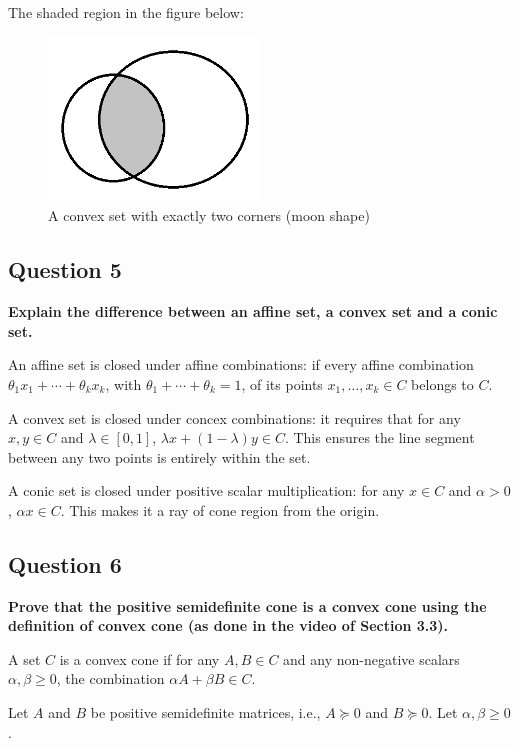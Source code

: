 The shaded region in the figure below: 

\begin{figure}[h]
\centering
\includegraphics[width=0.5\textwidth]{iRAT/Images/image_2_1.png}
\caption{A convex set with exactly two corners (moon shape)}
\end{figure}

\subsection*{Question 5}
\textbf{Explain the diﬀerence between an affine set, a convex set and a conic set.}

An affine set is closed under affine combinations: if every affine combination $\theta_1 x_1 + \cdots+ \theta_k x_k$, with $\theta_1 + \cdots+\theta_k = 1$, of its points  $x_1, \dots, x_k \in C$ belongs to $C$. 

A convex set is closed under concex combinations: it requires that for any \( x, y \in C \) and \( \lambda \in [0,1] \), \( \lambda x + (1-\lambda)y \in C \). This ensures the line segment between any two points is entirely within the set.

A conic set is closed under positive scalar multiplication: for any \( x \in C \) and \( \alpha > 0 \), \( \alpha x \in C \). This makes it a ray of cone region from the origin. 

\subsection*{Question 6}
\textbf{Prove that the positive semideﬁnite cone is a convex cone using the deﬁnition of convex cone (as done in the video of Section 3.3).}

A set \( C \) is a convex cone if for any \( A, B \in C \) and any non-negative scalars \( \alpha, \beta \geq 0 \), the combination \( \alpha A + \beta B \in C \).

Let \( A \) and \( B \) be positive semidefinite matrices, i.e., \( A \succeq 0 \) and \( B \succeq 0 \). Let \( \alpha, \beta \geq 0 \).

